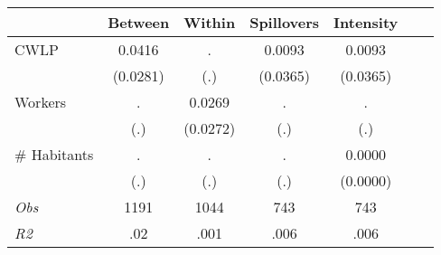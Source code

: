 \begin{tabular}{l*{6}{c}}\hline&\multicolumn{1}{c}{Between}&\multicolumn{1}{c}{Within}&\multicolumn{1}{c}{Spillovers}&\multicolumn{1}{c}{Intensity}\\ \hline 
CWLP & 0.0416 & . & 0.0093 & 0.0093 \\
 & (0.0281) & (.) & (0.0365) & (0.0365) \\
Workers & . & 0.0269 & . & . \\
 & (.) & (0.0272) & (.) & (.) \\
\# Habitants & . & . & . & 0.0000 \\
  & (.) & (.) & (.) & (0.0000) \\
\hline \textit{Obs} & 1191 & 1044 & 743 & 743  \\ \textit{R2} & .02 & .001 & .006 & .006 \\ \hline \end{tabular}
